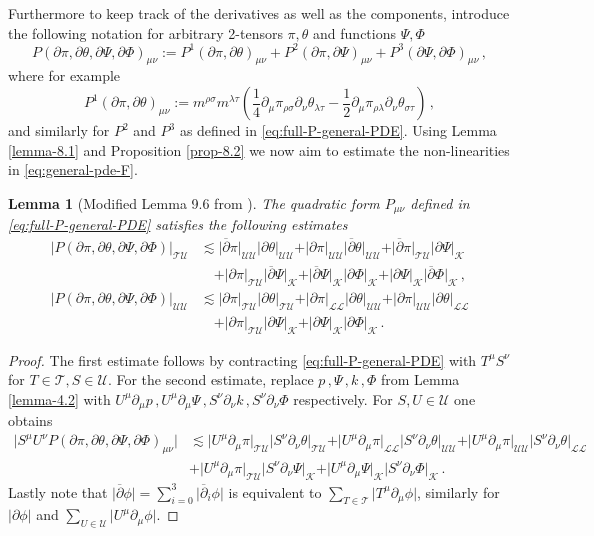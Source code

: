 \documentclass[11pt, a4paper]{amsart}
\numberwithin{equation}{section}
\newtheorem{lemma}[theorem]{Lemma}
\numberwithin{theorem}{section}
\newcommand{\p}{\partial}
\newcommand{\mn}{{\mu \nu}}
\newcommand{\pgood}{\overline{\partial}}
\newcommand{\UU}{{\mathcal{U} \mathcal{U}}}
\newcommand{\LL}{{\mathcal{L} \mathcal{L}}}
\newcommand{\TU}{{\mathcal{T} \mathcal{U}}}
\newcommand{\K}{\mathcal{K}}
\begin{document}
Furthermore to keep track of the derivatives as well as the components, introduce the following notation for arbitrary 2-tensors $\pi, \theta$ and functions $\Psi, \Phi$
$$ P(\p \pi, \p \theta, \p \Psi, \p \Phi)_\mn := P^1(\p \pi, \p \theta)_\mn + P^2 (\p \pi, \p \Psi)_\mn + P^3(\p \Psi, \p \Phi) _\mn\,,$$
where for example
$$ P^1(\p \pi, \p \theta)_\mn := m^{\rho \sigma} m^{\lambda \tau} \left( \frac{1}{4}  \p_\mu \pi_{\rho \sigma} \p_\nu \theta_{\lambda \tau} - \frac{1}{2}  \p_\mu \pi_{\rho \lambda} \p_\nu \theta_{\sigma \tau} \right) \,,$$
and similarly for $P^2$ and $P^3$ as defined in \eqref{eq:full-P-general-PDE}. 
Using Lemma \ref{lemma-8.1} and Proposition \ref{prop-8.2} we now aim to estimate the non-linearities in \eqref{eq:general-pde-F}. 
\begin{lemma}[Modified Lemma 9.6 from \cite{LR:04}] \label{lemma-9.6}
The quadratic form $P_\mn$ defined in \eqref{eq:full-P-general-PDE} satisfies the following estimates
\begin{align*} \vert P (\p \pi, \p \theta, \p \Psi, \p \Phi) \vert_\TU & \lesssim \vert \pgood \pi \vert_\UU \vert \p \theta \vert_\UU + \vert \p \pi \vert_\UU \vert \pgood \theta \vert_\UU + \vert \pgood \pi \vert_\TU \vert \p \Psi \vert_\K \\
& \quad + \vert \p \pi \vert_\TU \vert \pgood \Psi \vert_\K + \vert \pgood \Psi \vert_\K \vert \p \Phi \vert_\K + \vert \p \Psi \vert_\K \vert \pgood \Phi \vert_\K \,, \\
\vert P (\p \pi, \p \theta, \p \Psi, \p \Phi) \vert_\UU &\lesssim \vert \p \pi \vert_\TU \vert \p \theta \vert_\TU + \vert \p \pi \vert_\LL \vert \p \theta \vert_\UU + \vert \p \pi \vert_\UU \vert \p \theta \vert_\LL \\
& \quad + \vert \p \pi \vert_\TU \vert \p \Psi \vert_\K + \vert \p \Psi \vert_\K \vert \p \Phi \vert_\K \,.
\end{align*}
\end{lemma}
\begin{proof}
The first estimate follows by contracting \eqref{eq:full-P-general-PDE} with $T^\mu S^\nu$ for $T \in \mathcal{T}, S \in \mathcal{U}$.
For the second estimate, replace $p\,, \Psi \,, k \,, \Phi$ from Lemma \ref{lemma-4.2} with $U^\mu \p_\mu p \,, U^\mu \p_\mu \Psi \,, S^\nu \p_\nu k \,, S^\nu \p_\nu \Phi $ respectively. For $S, U \in \mathcal{U}$ one obtains
\begin{align*}
\vert S^\mu U^\nu  P(\p \pi, \p \theta, \p \Psi, \p \Phi)_\mn \vert & \lesssim \vert U^\mu \p_\mu \pi \vert_\TU \vert S^\nu \p_\nu \theta \vert_\TU + \vert U^\mu \p_\mu \pi \vert_\LL \vert S^\nu \p_\nu \theta \vert_\UU + \vert U^\mu \p_\mu \pi \vert_\UU \vert S^\nu \p_\nu \theta \vert_\LL \\
& + \vert U^\mu \p_\mu \pi \vert_\TU \vert S^\nu \p_\nu \Psi \vert_\K + \vert U^\mu \p_\mu \Psi \vert_\K \vert S^\nu \p_\nu \Phi \vert_\K \,.
\end{align*}
Lastly note that $\vert \pgood \phi \vert = \sum_{i=0}^3 \vert \pgood_i \phi \vert$ is equivalent to $\sum_{T \in \mathcal{T}} \vert T^\mu \p_\mu \phi \vert$, similarly for $\vert \p \phi \vert$ and $\sum_{U \in \mathcal{U}} \vert U^\mu \p_\mu \phi \vert$. 
\end{proof}
\end{document}
